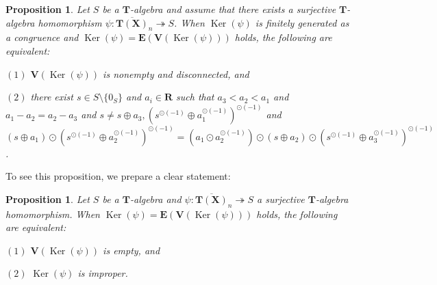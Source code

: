 \documentclass[a4paper,12pt]{amsart}
\newtheorem{prop}[dfn]{Proposition}
\begin{document}
\begin{prop}
    \label{prop4-1-4}
Let $S$ be a $\boldsymbol{T}$-algebra and assume that there exists a surjective $\boldsymbol{T}$-algebra homomorphism $\psi : \overline{\boldsymbol{T}(\boldsymbol{X})}_n \twoheadrightarrow S$.
When $\operatorname{Ker}(\psi)$ is finitely generated as a congruence and $\operatorname{Ker}(\psi) = \boldsymbol{E}(\boldsymbol{V}(\operatorname{Ker}(\psi)))$ holds, the following are equivalent:

$(1)$ $\boldsymbol{V}(\operatorname{Ker}(\psi))$ is nonempty and disconnected, and

$(2)$ there exist $s \in S \setminus \{ 0_S \}$ and $a_i \in \boldsymbol{R}$ such that $a_3 < a_2 < a_1$ and $a_1 - a_2 = a_2 - a_3$ and $s \not= s \oplus a_3, \left( s^{\odot (-1)} \oplus a_1^{\odot (-1)} \right)^{\odot (-1)}$ and $(s \oplus a_1) \odot \left(s^{\odot (-1)} \oplus a_2^{\odot (-1)} \right)^{\odot (-1)} = \left(a_1 \odot a_2^{\odot (-1)} \right) \odot (s \oplus a_2) \odot \left(s^{\odot (-1)} \oplus a_3^{\odot (-1)} \right)^{\odot (-1)}$.
\end{prop}

To see this proposition, we prepare a clear statement:

\begin{prop}
    \label{prop4-1-5}
Let $S$ be a $\boldsymbol{T}$-algebra and $\psi : \overline{\boldsymbol{T}(\boldsymbol{X})}_n \twoheadrightarrow S$ a surjective $\boldsymbol{T}$-algebra homomorphism.
When $\operatorname{Ker}(\psi) = \boldsymbol{E}(\boldsymbol{V}(\operatorname{Ker}(\psi)))$ holds, the following are equivalent:

$(1)$ $\boldsymbol{V}(\operatorname{Ker}(\psi))$ is empty, and

$(2)$ $\operatorname{Ker}(\psi)$ is improper.
\end{prop}
\end{document}
